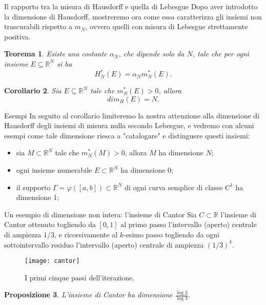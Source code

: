 \documentclass[intlimits]{beamer}
\numberwithin{equation}{section}
\theoremstyle{plain}
\newtheorem{teor}{Teorema}[section]
\newtheorem{prop}[teor]{Proposizione}
\newtheorem{cor}[teor]{Corollario}
\theoremstyle{definition}
\theoremstyle{remark}
\begin{document}
\begin{frame}{Il rapporto tra la misura di Hausdorff e quella di Lebesgue}
Dopo aver introdotto la dimensione di Hausdorff, mostreremo ora come essa caratterizza gli insiemi
non trascurabili rispetto a $m_N$, ovvero quelli con misura di Lebesgue strettamente positiva.
\pause
\begin{teor} Esiste una costante $\alpha_N$, che dipende solo da $N$, 
tale che per ogni insieme $E\subseteq \mathbb{R}^N$ si ha
\[ H^{*}_N(E) = \alpha_N m^{*}_N(E).\]
\end{teor}
\pause
\begin{cor} Sia $E\subseteq \mathbb{R}^N$ tale che $m^{*}_N(E) > 0$, allora
\[dim_H(E) = N .\] 
\end{cor}
\end{frame}


\begin{frame}{Esempi}
In seguito al corollario limiteremo la nostra attenzione alla dimensione di Hausdorff degli insiemi di misura nulla 
secondo Lebesgue, e vedremo con alcuni esempi come tale dimensione riesca a "catalogare" e distinguere questi insiemi:
\pause
\begin{itemize}[<+->]
  \item sia $M \subset \mathbb{R}^N$ tale che $m^*_N(M)>0$, allora $M$ ha dimensione $N$;
  \item ogni insieme numerabile $E \subset \mathbb{R}^N$ ha dimensione 0;
  \item il supporto $\Gamma=\varphi([a,b])\subset \mathbb{R}^N$ di ogni curva semplice di classe $C^1$ ha dimensione 1;
\end{itemize}
\end{frame}


\begin{frame}{Un esempio di dimensione non intera: l'insieme di Cantor}
Sia $C\subset \mathbb{R}$ l'insieme di Cantor ottenuto togliendo da $[0,1]$ al primo passo
l'intervallo (aperto) centrale di ampiezza $1/3$, e ricorsivamente al $k$-esimo passo togliendo da ogni 
sottointervallo residuo l'intervallo (aperto) centrale di ampiezza $(1/3)^k$.
\begin{figure}
  \texttt{[image: cantor]}
  \caption{I primi cinque passi dell'iterazione.}  
\end{figure}
\pause
\begin{prop} L'insieme di Cantor ha dimensione $\frac{\log 2}{\log 3}$.\end{prop}
\end{frame} 
\end{document}
